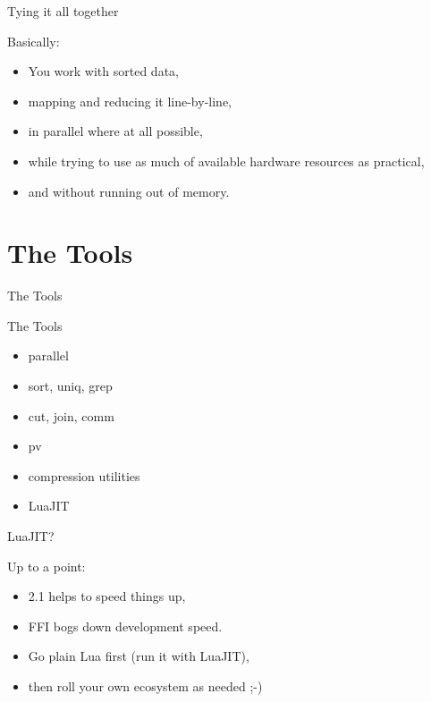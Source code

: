 \documentclass[handout]{beamer}
\begin{document}

\begin{frame}{Tying it all together}

Basically:
\begin{itemize}
\item You work with sorted data,
\item mapping and reducing it line-by-line,
\item in parallel where at all possible,
\item while trying to use as much of available hardware resources as practical,
\item and without running out of memory.
\end{itemize}

\end{frame}


\section{The Tools}


\begin{frame}
\huge The Tools
\end{frame}


\begin{frame}{The Tools}

\begin{itemize}
\item parallel
\item sort, uniq, grep
\item cut, join, comm
\item pv
\item compression utilities
\item LuaJIT
\end{itemize}

\end{frame}


\begin{frame}{LuaJIT?}

Up to a point:
\begin{itemize}
\item 2.1 helps to speed things up,
\item FFI bogs down development speed.
\item Go plain Lua first (run it with LuaJIT),
\item then roll your own ecosystem as needed ;-)
\end{itemize}

\end{frame}
\end{document}
